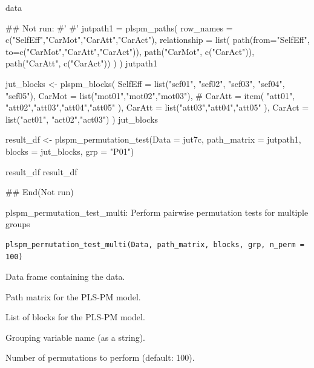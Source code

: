 \documentclass[a4paper]{book}
\begin{document}
%
\begin{Value}
data
\end{Value}
%
\begin{Examples}
\begin{ExampleCode}
\#\# Not run: 
#'
#'
jutpath1 = plspm_paths(
  row_names = c("SelfEff","CarMot","CarAtt","CarAct"),
  relationship = list(
    path(from="SelfEff", to=c("CarMot","CarAtt","CarAct")),
    path("CarMot", c("CarAct")),
    path("CarAtt", c("CarAct"))
  )  )
jutpath1


jut_blocks <- plspm_blocks(
  SelfEff = list("sef01", "sef02", "sef03", "sef04", "sef05"),
  CarMot = list("mot01","mot02","mot03"),
  #   CarAtt = item( "att01", "att02","att03","att04","att05" ),
  CarAtt = list("att03","att04","att05" ),
  CarAct = list("act01", "act02","act03")
)
jut_blocks


result_df <- plspm_permutation_test(Data = jut7c, path_matrix = jutpath1, blocks = jut_blocks, grp = "P01")


result_df
result_df %



## End(Not run)

\end{ExampleCode}
\end{Examples}
%
\begin{Description}
plspm\_permutation\_test\_multi: Perform pairwise permutation tests for multiple groups
\end{Description}
%
\begin{Usage}
\begin{verbatim}
plspm_permutation_test_multi(Data, path_matrix, blocks, grp, n_perm = 100)
\end{verbatim}
\end{Usage}
%
\begin{Arguments}
\begin{ldescription}
\item[\code{Data}] Data frame containing the data.

\item[\code{path\_matrix}] Path matrix for the PLS-PM model.

\item[\code{blocks}] List of blocks for the PLS-PM model.

\item[\code{grp}] Grouping variable name (as a string).

\item[\code{n\_perm}] Number of permutations to perform (default: 100).
\end{ldescription}
\end{Arguments}
\end{document}

